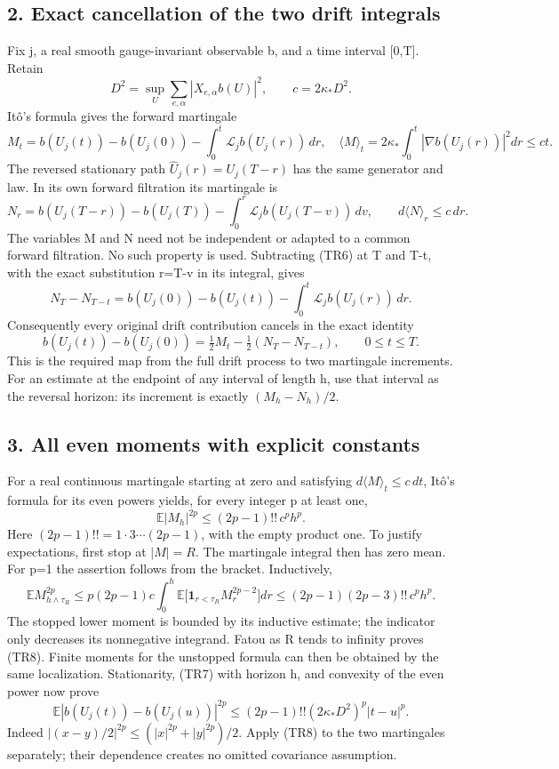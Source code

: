 \documentclass[11pt]{article}
\begin{document}
\subsection*{2. Exact cancellation of the two drift integrals}

Fix j, a real smooth gauge-invariant observable b, and a time interval [0,T]. Retain
\[
 D^2=\sup_U\sum_{e,\alpha}|X_{e,\alpha}b(U)|^2,
 \qquad c=2\kappa_*D^2.
 \tag{TR4}
\]
Itô's formula gives the forward martingale
\[
 M_t=b(U_j(t))-b(U_j(0))-\int_0^t\mathcal L_jb(U_j(r))\,dr,
 \quad
 \langle M\rangle_t=2\kappa_*\int_0^t|\nabla b(U_j(r))|^2dr\le ct.
 \tag{TR5}
\]
The reversed stationary path \(\widehat U_j(r)=U_j(T-r)\) has the same generator and law. In its own forward filtration its martingale is
\[
 N_r=b(U_j(T-r))-b(U_j(T))
       -\int_0^r\mathcal L_jb(U_j(T-v))\,dv,
 \qquad d\langle N\rangle_r\le c\,dr.
 \tag{TR6}
\]
The variables M and N need not be independent or adapted to a common forward filtration. No such property is used. Subtracting (TR6) at T and T-t, with the exact substitution r=T-v in its integral, gives
\[
 N_T-N_{T-t}=b(U_j(0))-b(U_j(t))-\int_0^t\mathcal L_jb(U_j(r))\,dr.
\]
Consequently every original drift contribution cancels in the exact identity
\[
 b(U_j(t))-b(U_j(0))
   =\tfrac12 M_t-\tfrac12(N_T-N_{T-t}),\qquad 0\le t\le T.
 \tag{TR7}
\]
This is the required map from the full drift process to two martingale increments. For an estimate at the endpoint of any interval of length h, use that interval as the reversal horizon: its increment is exactly \((M_h-N_h)/2\).

\subsection*{3. All even moments with explicit constants}

For a real continuous martingale starting at zero and satisfying \(d\langle M\rangle_t\le c\,dt\), Itô's formula for its even powers yields, for every integer p at least one,
\[
 \mathbb E|M_h|^{2p}\le (2p-1)!!\,c^p h^p.
 \tag{TR8}
\]
Here \((2p-1)!!=1\cdot3\cdots(2p-1)\), with the empty product one. To justify expectations, first stop at \(|M|=R\). The martingale integral then has zero mean. For p=1 the assertion follows from the bracket. Inductively,
\[
 \mathbb E M_{h\wedge\tau_R}^{2p}
 \le p(2p-1)c\int_0^h
      \mathbb E\bigl[\mathbf1_{r<\tau_R}M_r^{2p-2}\bigr]dr
 \le (2p-1)(2p-3)!!\,c^ph^p.
\]
The stopped lower moment is bounded by its inductive estimate; the indicator only decreases its nonnegative integrand. Fatou as R tends to infinity proves (TR8). Finite moments for the unstopped formula can then be obtained by the same localization. Stationarity, (TR7) with horizon h, and convexity of the even power now prove
\[
 \boxed{\quad
 \mathbb E|b(U_j(t))-b(U_j(u))|^{2p}
 \le (2p-1)!!(2\kappa_*D^2)^p|t-u|^p.
 \quad}\tag{TR9}
\]
Indeed \(|(x-y)/2|^{2p}\le(|x|^{2p}+|y|^{2p})/2\). Apply (TR8) to the two martingales separately; their dependence creates no omitted covariance assumption.
\end{document}
